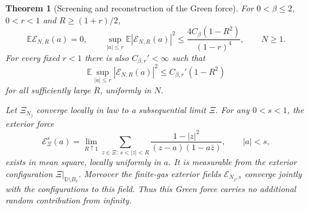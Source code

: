 \documentclass[11pt]{article}
\newcommand{\D}{\mathbb D}
\newtheorem{theorem}{Theorem}[section]
\theoremstyle{remark}\newtheorem{remark}[theorem]{Remark}
\begin{document}
\begin{theorem}[Screening and reconstruction of the Green force]
\label{thm:green-force-reconstruction}
For $0<\beta\le2$, $0<r<1$ and $R\ge(1+r)/2$,
\begin{equation}\label{eq:green-force-L2}
 \mathbb E\mathcal E_{N,R}(a)=0,\qquad
 \sup_{|a|\le r}\mathbb E|\mathcal E_{N,R}(a)|^2
 \le\frac{4C_\beta(1-R^2)}{(1-r)^4},
 \qquad N\ge1.
\end{equation}
For every fixed $r<1$ there is also $C_{\beta,r}'<\infty$ such that
\[
 \mathbb E\sup_{|a|\le r}|\mathcal E_{N,R}(a)|^2
 \le C_{\beta,r}'(1-R^2)
\]
for all sufficiently large $R$, uniformly in $N$.

Let $\Xi_{N_j}$ converge locally in law to a subsequential limit
$\Xi$. For any $0<s<1$, the exterior force
\begin{equation}\label{eq:configuration-force}
 \mathcal E_\Xi^{s}(a)
 =\lim_{R\uparrow1}
 \sum_{z\in\Xi:\ s<|z|<R}
       \frac{1-|z|^2}{(z-a)(1-a\bar z)},\qquad |a|<s,
\end{equation}
exists in mean square, locally uniformly in $a$. It is measurable
from the exterior configuration $\Xi|_{\D\setminus B_s}$.
Moreover the finite-gas exterior fields $\mathcal E_{N_j,s}$
converge jointly with the configurations to this field. Thus this
Green force carries no additional random contribution from infinity.
\end{theorem}
\end{document}
